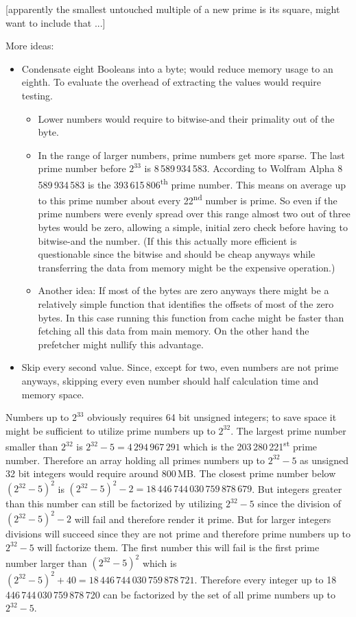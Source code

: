 \documentclass[a4paper,10pt]{article}
\begin{document}
[apparently the smallest untouched multiple of a new prime is its square, might want to include that ...]

More ideas:
\begin{itemize}
 \item Condensate eight Booleans into a byte; would reduce memory usage to an eighth. To evaluate the overhead of extracting the values would require testing.
 \begin{itemize}
  \item Lower numbers would require to bitwise-and their primality out of the byte.
  \item In the range of larger numbers, prime numbers get more sparse.
  The last prime number before $2^{33}$ is 8\,589\,934\,583.
  According to Wolfram Alpha 8\,589\,934\,583 is the 393\,615\,806\textsuperscript{th} prime number.
  This means on average up to this prime number about every 22\textsuperscript{nd} number is prime.
  So even if the prime numbers were evenly spread over this range almost two out of three bytes would be zero,
  allowing a simple, initial zero check before having to bitwise-and the number.
  (If this this actually more efficient is questionable since the bitwise and should be cheap anyways
  while transferring the data from memory might be the expensive operation.)
  \item Another idea:
  If most of the bytes are zero anyways there might be a relatively simple function that identifies the offsets of most of the zero bytes.
  In this case running this function from cache might be faster than fetching all this data from main memory.
  On the other hand the prefetcher might nullify this advantage.
 \end{itemize}
 \item Skip every second value.
 Since, except for two, even numbers are not prime anyways,
 skipping every even number should half calculation time and memory space.

\end{itemize}



Numbers up to $2^{33}$ obviously requires 64 bit unsigned integers;
to save space it might be sufficient to utilize prime numbers up to $2^{32}$.
The largest prime number smaller than $2^{32}$ is $2^{32} - 5 = 4\,294\,967\,291$
which is the 203\,280\,221\textsuperscript{st} prime number.
Therefore an array holding all primes numbers up to $2^{32} - 5$ as unsigned 32 bit integers would require around 800\,MB.
The closest prime number below $(2^{32} - 5)^2$ is $(2^{32} - 5)^2 - 2 = 18\,446\,744\,030\,759\,878\,679$.
But integers greater than this number can still be factorized by utilizing $2^{32} - 5$
since the division of $(2^{32} - 5)^2 - 2$ will fail
and therefore render it prime.
But for larger integers divisions will succeed
since they are not prime and therefore prime numbers up to $2^{32} - 5$ will factorize them.
The first number this will fail is the first prime number larger than $(2^{32} - 5)^2$
which is $(2^{32} - 5)^2 + 40 = 18\,446\,744\,030\,759\,878\,721$.
Therefore every integer up to 18\,446\,744\,030\,759\,878\,720 can be factorized by the set of all prime numbers up to $2^{32} - 5$.
\end{document}
